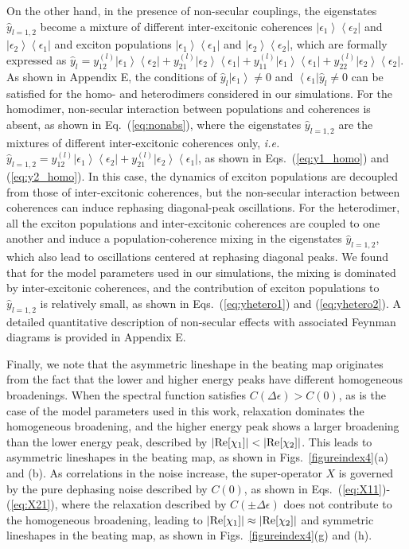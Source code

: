 \documentclass[%
 reprint,%
 amssymb, amsmath,%
 aip,cha,%
]{revtex4-1}
\newcommand{\bra}[1]{\ensuremath{\left\langle{#1}\right\vert}}
\newcommand{\ket}[1]{\ensuremath{\left|{#1}\right\rangle}}
\begin{document}
On the other hand, in the presence of non-secular couplings, the eigenstates $\hat{y}_{l=1,2}$ become a mixture of different inter-excitonic coherences $\ket{\epsilon_1}\bra{\epsilon_2}$ and $\ket{\epsilon_2}\bra{\epsilon_1}$ and exciton populations $\ket{\epsilon_1}\bra{\epsilon_1}$ and $\ket{\epsilon_2}\bra{\epsilon_2}$, which are formally expressed as $\hat{y}_{l}=y^{(l)}_{12}\ket{\epsilon_1}\bra{\epsilon_2}+y^{(l)}_{21}\ket{\epsilon_2}\bra{\epsilon_1}+y^{(l)}_{11}\ket{\epsilon_1}\bra{\epsilon_1}+y^{(l)}_{22}\ket{\epsilon_2}\bra{\epsilon_2}$.  As shown in Appendix E, the conditions of $\hat{y}_l\ket{\epsilon_1}\neq0$ and $\bra{\epsilon_1}\hat{y}_l\neq0$ can be satisfied for the homo- and heterodimers considered in our simulations. For the homodimer, non-secular interaction between populations and coherences is absent, as shown in Eq.~(\ref{eq:nonabs}), where the eigenstates $\hat{y}_{l=1,2}$ are the mixtures of different inter-excitonic coherences only, {\it i.e.} $\hat{y}_{l=1,2}=y^{(l)}_{12}\ket{\epsilon_1}\bra{\epsilon_2}+y^{(l)}_{21}\ket{\epsilon_2}\bra{\epsilon_1}$, as shown in Eqs.~(\ref{eq:y1_homo}) and (\ref{eq:y2_homo}).  In this case, the dynamics of exciton populations are decoupled from those of inter-excitonic coherences, but the non-secular interaction between coherences can induce rephasing diagonal-peak oscillations. For the heterodimer, all the exciton populations and inter-excitonic coherences are coupled to one another and induce a population-coherence mixing in the eigenstates $\hat{y}_{l=1,2}$, which also lead to oscillations centered at rephasing diagonal peaks.  We found that for the model parameters used in our simulations, the mixing is dominated by inter-excitonic coherences, and the contribution of exciton populations to $\hat{y}_{l=1,2}$ is relatively small, as shown in Eqs.~(\ref{eq:yhetero1}) and (\ref{eq:yhetero2}).  A detailed quantitative description of non-secular effects with associated Feynman diagrams is provided in Appendix E.

Finally, we note that the asymmetric lineshape in the beating map originates from the fact that the lower and higher energy peaks have different homogeneous broadenings.  When the spectral function satisfies $C\left(\Delta\epsilon\right)>C\left(0\right)$, as is the case of the model parameters used in this work, relaxation dominates the homogeneous broadening, and the higher energy peak shows a larger broadening than the lower energy peak, described by $\mathrm{|}{\rm Re}[\chi_1]\mathrm{|}<\mathrm{|}{\rm Re}[\chi_2]\mathrm{|}$.  This leads to asymmetric lineshapes in the beating map, as shown in Figs.~\ref{figureindex4}(a) and (b).  As correlations in the noise increase, the super-operator $X$ is governed by the pure dephasing noise described by $C\left(0\right)$, as shown in Eqs.~(\ref{eq:X11})-(\ref{eq:X21}), where the relaxation described by $C\left(\pm\Delta\epsilon\right)$ does not contribute to the homogeneous broadening, leading to $\mathrm{|}{\rm Re}[\chi_1]\mathrm{|}\approx\mathrm{|}{\rm Re}[\chi_2]\mathrm{|}$ and symmetric lineshapes in the beating map, as shown in Figs.~\ref{figureindex4}(g) and (h).
\end{document}
